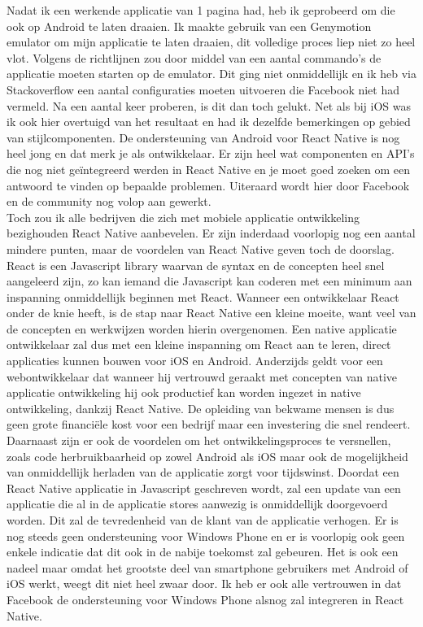 	Nadat ik een werkende applicatie van 1 pagina had, heb ik geprobeerd om die ook op Android te laten draaien. Ik maakte gebruik van een Genymotion emulator om mijn applicatie te laten draaien, dit volledige proces liep niet zo heel vlot. Volgens de richtlijnen zou door middel van een aantal commando's de applicatie moeten starten op de emulator. Dit ging niet onmiddellijk en ik heb via Stackoverflow een aantal configuraties moeten uitvoeren die Facebook niet had vermeld. Na een aantal keer proberen, is dit dan toch gelukt. Net als bij iOS was ik ook hier overtuigd van het resultaat en had ik dezelfde bemerkingen op gebied van stijlcomponenten. De ondersteuning van Android voor React Native is nog heel jong en dat merk je als ontwikkelaar. Er zijn heel wat componenten en API's die nog niet geïntegreerd werden in React Native en je moet goed zoeken om een antwoord te vinden op bepaalde problemen. Uiteraard wordt hier door Facebook en de community nog volop aan gewerkt.\\ 
	Toch zou ik alle bedrijven die zich met mobiele applicatie ontwikkeling bezighouden React Native aanbevelen. Er zijn inderdaad voorlopig nog een aantal mindere punten, maar de voordelen van React Native geven toch de doorslag. React is een Javascript library waarvan de syntax en de concepten heel snel aangeleerd zijn, zo kan iemand die Javascript kan coderen met een minimum aan inspanning onmiddellijk beginnen met React. Wanneer een ontwikkelaar React onder de knie heeft, is de stap naar React Native een kleine moeite, want veel van de concepten en werkwijzen worden hierin overgenomen. Een native applicatie ontwikkelaar zal dus met een kleine inspanning om React aan te leren, direct applicaties kunnen bouwen voor iOS en Android. Anderzijds geldt voor een webontwikkelaar dat wanneer hij vertrouwd geraakt met concepten van native applicatie ontwikkeling hij ook productief kan worden ingezet in native ontwikkeling, dankzij React Native. De opleiding van bekwame mensen is dus geen grote financiële kost voor een bedrijf maar een investering die snel rendeert.\\
	Daarnaast zijn er ook de voordelen om het ontwikkelingsproces te versnellen, zoals code herbruikbaarheid op zowel Android als iOS maar ook de mogelijkheid van onmiddellijk herladen van de applicatie zorgt voor tijdswinst. Doordat een React Native applicatie in Javascript geschreven wordt, zal een update van een applicatie die al in de applicatie stores aanwezig is onmiddellijk doorgevoerd worden. Dit zal de tevredenheid van de klant van de applicatie verhogen.
Er is nog steeds geen ondersteuning voor Windows Phone en er is voorlopig ook geen enkele indicatie dat dit ook in de nabije toekomst zal gebeuren. Het is ook een nadeel maar omdat het grootste deel van smartphone gebruikers met Android of iOS werkt, weegt dit niet heel zwaar door. Ik heb er ook alle vertrouwen in dat Facebook de ondersteuning voor Windows Phone alsnog zal integreren in React Native.


